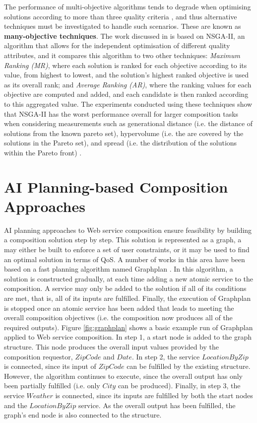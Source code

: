 The performance of multi-objective algorithms tends to degrade when optimising solutions according to more than three quality criteria \cite{de2010many}, and thus alternative techniques must be investigated to handle such scenarios. These are known as \textbf{many-objective techniques}. The work discussed in \cite{de2010many} is based on NSGA-II, an algorithm that allows for the independent optimisation of different quality attributes, and it compares this algorithm to two other techniques: \textit{Maximum Ranking (MR)}, where each solution is ranked for each objective according to its value, from highest to lowest, and the solution's highest ranked objective is used as its overall rank; and \textit{Average Ranking (AR)}, where the ranking values for each objective are computed and added, and each candidate is then ranked according to this aggregated value. The experiments conducted using these techniques show that NSGA-II has the worst performance overall for larger composition tasks when considering measurements such as generational distance (i.e. the distance of solutions from the known pareto set), hypervolume (i.e. the are covered by the solutions in the Pareto set), and spread (i.e. the distribution of the solutions within the Pareto front) \cite{bader2010hypervolume,joshi2015improving}.

\section{AI Planning-based Composition Approaches}\label{planning}

AI planning approaches to Web service composition ensure feasibility by building a composition solution step by step. This solution is represented as a graph, a may either be built to enforce a set of user constraints, or it may be used to find an optimal solution in terms of QoS. A number of works in this area \cite{feng2013dynamic,wang2013genetic,xia2013web,wang2014automated} have been based on a fast planning algorithm named Graphplan \cite{blum1997fast}. In this algorithm, a solution is constructed gradually, at each time adding a new atomic service to the composition. A service may only be added to the solution if all of its conditions are met, that is, all of its inputs are fulfilled. Finally, the execution of Graphplan is stopped once an atomic service has been added that leads to meeting the overall composition objectives (i.e. the composition now produces all of the required outputs). Figure \ref{fig:graphplan} shows a basic example run of Graphplan applied to Web service composition. In step 1, a start node is added to the graph structure. This node produces the overall input values provided by the composition requestor, $ZipCode$ and $Date$. In step 2, the service $LocationByZip$ is connected, since its input of $ZipCode$ can be fulfilled by the existing structure. However, the algorithm continues to execute, since the overall output has only been partially fulfilled (i.e. only $City$ can be produced). Finally, in step 3, the service $Weather$ is connected, since its inputs are fulfilled by both the start nodes and the $LocationByZip$ service. As the overall output has been fulfilled, the graph's end node is also connected to the structure.

